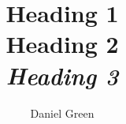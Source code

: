 \documentclass[12pt, pdftex]{article}
\title{
	\vspace{2in}
	\textmd{\textbf{Heading 1}}\\
	\normalsize\vspace{0.1in}\small{Heading 2}\\
	\vspace{0.1in}
	\large{\textit{Heading 3}}\\
	\vspace{3in}
}
\author{Daniel Green}
\begin{document}
\maketitle
\clearpage

\tableofcontents
\clearpage



\clearpage


\clearpage


\clearpage


\clearpage


\clearpage

\begin{appendices}

\end{appendices}

\newpage
\printbibliography
\end{document}
